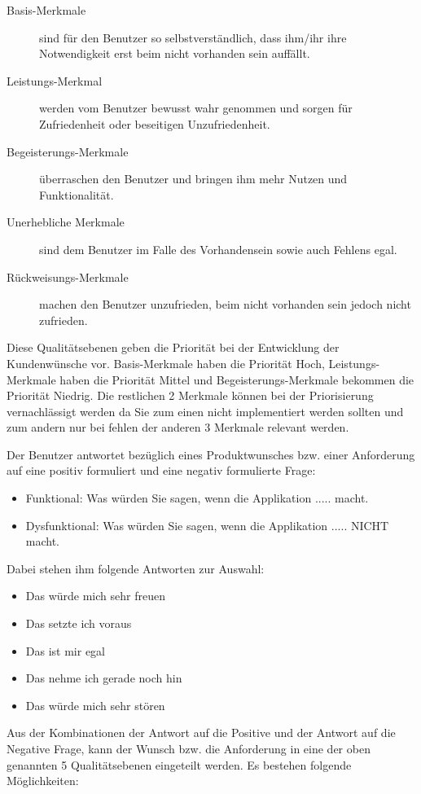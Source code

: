 \begin{description}
	\item[Basis-Merkmale] sind für den Benutzer so selbstverständlich, dass ihm/ihr ihre Notwendigkeit erst beim nicht vorhanden sein auffällt.
	\item[Leistungs-Merkmal] werden vom Benutzer bewusst wahr genommen und sorgen für Zufriedenheit oder beseitigen Unzufriedenheit.
	\item[Begeisterungs-Merkmale] überraschen den Benutzer und bringen ihm mehr Nutzen und Funktionalität.
	\item[Unerhebliche Merkmale] sind dem Benutzer im Falle des Vorhandensein sowie auch Fehlens egal.
	\item[Rückweisungs-Merkmale] machen den Benutzer unzufrieden, beim nicht vorhanden sein jedoch nicht zufrieden.
\end{description}

Diese Qualitätsebenen geben die Priorität bei der Entwicklung der Kundenwünsche vor. Basis-Merkmale haben die Priorität Hoch, Leistungs-Merkmale haben die Priorität Mittel und Begeisterungs-Merkmale bekommen die Priorität Niedrig. Die restlichen 2 Merkmale können bei der Priorisierung vernachlässigt werden da Sie zum einen nicht implementiert werden sollten und zum andern nur bei fehlen der anderen 3 Merkmale relevant werden.

Der Benutzer antwortet bezüglich eines Produktwunsches bzw. einer Anforderung auf eine positiv formuliert und eine negativ formulierte Frage:
\begin{itemize}
	\item Funktional: Was würden Sie sagen, wenn die Applikation ..... macht.
	\item Dysfunktional: Was würden Sie sagen, wenn die Applikation ..... NICHT macht.
\end{itemize}

Dabei stehen ihm folgende Antworten zur Auswahl:

\begin{itemize}
	\item Das würde mich sehr freuen
	\item Das setzte ich voraus
	\item Das ist mir egal
	\item Das nehme ich gerade noch hin
	\item Das würde mich sehr stören
\end{itemize}

Aus der Kombinationen der Antwort auf die Positive und der Antwort auf die Negative Frage, kann der Wunsch bzw. die Anforderung in eine der oben genannten 5 Qualitätsebenen eingeteilt werden. Es bestehen folgende Möglichkeiten:

